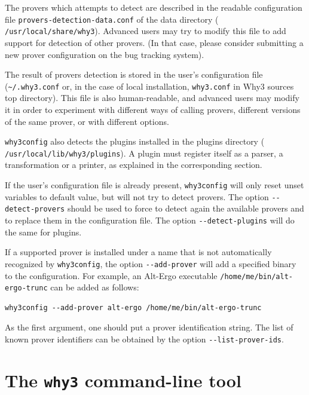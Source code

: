 The provers which \why attempts to detect are described in
the readable configuration file \texttt{provers-detection-data.conf}
of the \why data directory (\eg{}
\texttt{/usr/local/share/why3}). Advanced users may try to modify this
file to add support for detection of other provers. (In that case,
please consider submitting a new prover configuration on the bug
tracking system).

The result of provers detection is stored in the user's
configuration file (\verb+~/.why3.conf+ or, in the case of local
installation, \verb+why3.conf+ in Why3 sources top directory). This file
is also human-readable, and advanced users may modify it in order to
experiment with different ways of calling provers, \eg{} different
versions of the same prover, or with different options.

\texttt{why3config} also detects the plugins installed in the \why
plugins directory (\eg{} \texttt{/usr/local/lib/why3/plugins}). A
plugin must register itself as a parser, a transformation or a
printer, as explained in the corresponding section.

If the user's configuration file is already present,
\texttt{why3config} will only reset unset variables to default value,
but will not try to detect provers.
The option \verb|--detect-provers| should be used to force
\why to detect again the available
provers and to replace them in the configuration file. The option
\verb|--detect-plugins| will do the same for plugins.

If a supported prover is installed under a name
that is not automatically recognized by \texttt{why3config},
the option \verb|--add-prover| will add a specified binary
to the configuration. For example, an Alt-Ergo executable
\verb|/home/me/bin/alt-ergo-trunc| can be added as follows:
\begin{verbatim}
why3config --add-prover alt-ergo /home/me/bin/alt-ergo-trunc
\end{verbatim}
As the first argument, one should put a prover
identification string. The list of known prover identifiers
can be obtained by the option \verb|--list-prover-ids|.

\section{The \texttt{why3} command-line tool}
\label{sec:why3ref}

